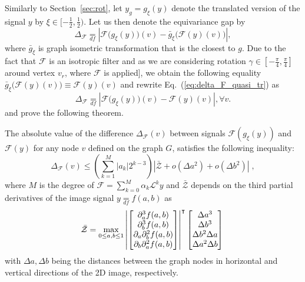 \documentclass[10pt,journal,compsoc]{IEEEtran}
\newcommand{\df}{\mathop{=}\limits_{df}}
\newcommand{\mF}{\mathcal{F}}
\newcommand{\norm}[1]{\left|#1\right|}
\begin{document}
	 Similarly to Section~\ref{sec:rot}, let $y_g = g_\xi(y)$ denote the translated version of the signal $y$ by $\xi \in [-\frac{1}{2},\frac{1}{2})$. Let us then denote the equivariance gap by
	 \begin{equation}
	 \Delta_\mathcal{F} \df \left| \mathcal{F}\big(g_{\xi} (y)\big)(v) - \bar{g}_{\xi}\big(\mathcal{F}(y)(v)\big) \right| ,
	 \label{eq:delta_F_quasi_tr}
	 \end{equation}
	 where $\bar{g}_{\xi}$ is graph isometric transformation that is the closest to $g$. Due to the fact that $\mF$ is an isotropic filter and as we are considering rotation $\gamma \in [-\frac{\pi}{4}, \frac{\pi}{4}]$ around vertex $v_r$, where $\mF$ is applied], we obtain the following equality $\bar{g}_{\xi}\big(\mF(y)(v)\big) \equiv \mF(y)(v)$ and rewrite Eq.~(\ref{eq:delta_F_quasi_tr}) as
	 \begin{equation}
	 \Delta_\mathcal{F} \df \left| \mathcal{F}\big(g_{\xi} (y)\big)(v) - \mathcal{F}(y)(v) \right|, \forall v.
	 \label{eq:equivariance_ref_trans_notations_smpl}
	 \end{equation}
	\noindent
	and prove the following theorem.



	\begin{theorem}
		The absolute value of the difference $\Delta_\mathcal{F}(v)$ between signals $\mathcal{F}(g_\xi (y))$ and $\mathcal{F}(y)$ for any node $v$ defined on the graph $G$, satisfies the following inequality:
		\begin{equation}
		\Delta_\mathcal{F} (v) \leq \left( \sum_{k=1}^{M} \norm{a_k} 2^{k-3} \right) \norm{\bar{\mathcal{Z}} + o(\Delta a^2) + o(\Delta b^2)}\;,
		\label{eq:filt_diff}
		\end{equation}
		\noindent
		where $M$ is the degree of $\mathcal{F} = \sum_{k=0}^M \alpha_k \mathcal{L}^k y$ and $\bar{\mathcal{Z}}$ depends on the third partial derivatives of the image signal $y \df f(a,b)$ as
		\begin{equation}
		\bar{\mathcal{Z}} =
		\max_{0 \leq a,b \leq 1} \left|
		\begin{bmatrix}
		\partial^3_a f(a,b) \\
		\partial^3_b f(a,b) \\
		\partial_a\partial^2_b f(a,b) \\
		\partial_b\partial^2_a f(a,b) \\
		\end{bmatrix}
		\right|^{\intercal}
		\begin{bmatrix}
		\Delta a^3 \\
		\Delta b^3 \\
		\Delta b^2 \Delta a \\
		\Delta a^2 \Delta b \\
		\end{bmatrix} \\
		\label{eq:trans_z}
		\end{equation}
		\noindent
		with $\Delta a, \Delta b$ being the distances between the graph nodes in horizontal and vertical directions of the 2D image, respectively.
		\label{t:im_trans}
	\end{theorem}
\end{document}
